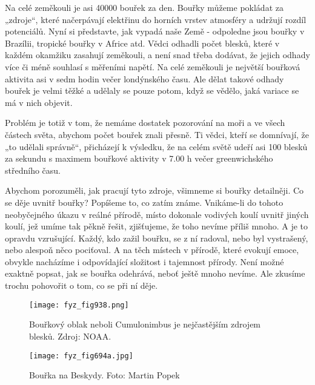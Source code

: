     Na celé zeměkouli je asi \num{40 000} bouřek za den. Bouřky můžeme pokládat za „zdroje“, které
    načerpávají elektřinu do horních vrstev atmosféry a udržují rozdíl potenciálů. Nyní si
    představte, jak vypadá naše Země - odpoledne jsou bouřky v Brazílii, tropické bouřky v Africe
    atd. Vědci odhadli počet blesků, které v každém okamžiku zasahují zeměkouli, a není snad třeba
    dodávat, že jejich odhady více či méně souhlasí s měřeními napětí. Na celé zeměkouli je největší
    bouřková aktivita asi v sedm hodin večer londýnského času. Ale dělat takové odhady bouřek je
    velmi těžké a udělaly se pouze potom, když se vědělo, jaká variace se má v nich objevit.
  
    Problém je totiž v tom, že nemáme dostatek pozorování na moři a ve všech částech světa, abychom
    počet bouřek znali přesně. Ti vědci, kteří se domnívají, že „to udělali správně“, přicházejí k
    výsledku, že na celém světě udeří asi \num{100} blesků za sekundu s maximem bouřkové aktivity v
    7.00 h večer greenwichského středního času.

    Abychom porozuměli, jak pracují tyto zdroje, všimneme si bouřky detailněji. Co se děje uvnitř
    bouřky? Popíšeme to, co zatím známe. Vnikáme-li do tohoto neobyčejného úkazu v reálné přírodě,
    místo dokonale vodivých koulí uvnitř jiných koulí, jež umíme tak pěkně řešit, zjišťujeme, že
    toho nevíme příliš mnoho. A je to opravdu vzrušující. Každý, kdo zažil bouřku, se z ní radoval,
    nebo byl vystrašený, nebo alespoň něco pociťoval. A na těch místech v přírodě, které evokují
    emoce, obvykle nacházíme i odpovídající složitost i tajemnost přírody. Není možné exaktně
    popsat, jak se bouřka odehrává, neboť ještě mnoho nevíme. Ale zkusíme trochu pohovořit o tom, co
    se při ní děje.

    \begin{figure}[ht!] %
      \centering
      \texttt{[image: fyz\_fig938.png]}
      \caption{Bouřkový oblak neboli Cumulonimbus je nejčastějším zdrojem blesků. Zdroj: NOAA.}
      \label{fyz:fig938}
    \end{figure}

    \begin{figure}[ht!] %
      \centering
      \texttt{[image: fyz\_fig694a.jpg]}
      \caption{Bouřka na Beskydy. Foto: Martin Popek}
      \label{fyz:fig694}
    \end{figure}

